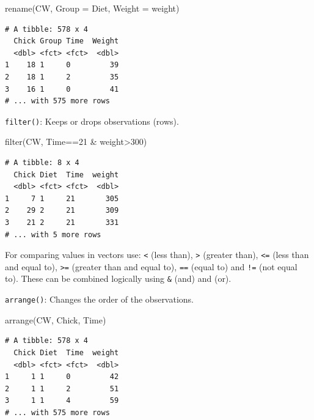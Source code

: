 \documentclass[
  letterpaper,
  DIV=11,
  numbers=noendperiod]{scrreprt}
\newenvironment{Shaded}{\begin{snugshade}}{\end{snugshade}}
\newcommand{\AttributeTok}[1]{\textcolor[rgb]{0.40,0.45,0.13}{#1}}
\newcommand{\DecValTok}[1]{\textcolor[rgb]{0.68,0.00,0.00}{#1}}
\newcommand{\FunctionTok}[1]{\textcolor[rgb]{0.28,0.35,0.67}{#1}}
\newcommand{\NormalTok}[1]{\textcolor[rgb]{0.00,0.23,0.31}{#1}}
\newcommand{\SpecialCharTok}[1]{\textcolor[rgb]{0.37,0.37,0.37}{#1}}
\theoremstyle{definition}
\theoremstyle{plain}
\theoremstyle{plain}
\theoremstyle{remark}
\begin{document}
\begin{Shaded}
\begin{Highlighting}[]
\FunctionTok{rename}\NormalTok{(CW, }\AttributeTok{Group =}\NormalTok{ Diet, }\AttributeTok{Weight =}\NormalTok{ weight)}
\end{Highlighting}
\end{Shaded}

\begin{verbatim}
# A tibble: 578 x 4
  Chick Group Time  Weight
  <dbl> <fct> <fct>  <dbl>
1    18 1     0         39
2    18 1     2         35
3    16 1     0         41
# ... with 575 more rows
\end{verbatim}

\hfill\break

\texttt{filter()}: Keeps or drops observations (rows).

\begin{Shaded}
\begin{Highlighting}[]
\FunctionTok{filter}\NormalTok{(CW, Time}\SpecialCharTok{==}\DecValTok{21} \SpecialCharTok{\&}\NormalTok{ weight}\SpecialCharTok{\textgreater{}}\DecValTok{300}\NormalTok{)}
\end{Highlighting}
\end{Shaded}

\begin{verbatim}
# A tibble: 8 x 4
  Chick Diet  Time  weight
  <dbl> <fct> <fct>  <dbl>
1     7 1     21       305
2    29 2     21       309
3    21 2     21       331
# ... with 5 more rows
\end{verbatim}

For comparing values in vectors use: \texttt{\textless{}} (less than),
\texttt{\textgreater{}} (greater than), \texttt{\textless{}=} (less than
and equal to), \texttt{\textgreater{}=} (greater than and equal to),
\texttt{==} (equal to) and \texttt{!=} (not equal to). These can be
combined logically using \texttt{\&} (and) and \texttt{\textbar{}} (or).

\hfill\break

\texttt{arrange()}: Changes the order of the observations.

\begin{Shaded}
\begin{Highlighting}[]
\FunctionTok{arrange}\NormalTok{(CW, Chick, Time)}
\end{Highlighting}
\end{Shaded}

\begin{verbatim}
# A tibble: 578 x 4
  Chick Diet  Time  weight
  <dbl> <fct> <fct>  <dbl>
1     1 1     0         42
2     1 1     2         51
3     1 1     4         59
# ... with 575 more rows
\end{verbatim}
\end{document}
